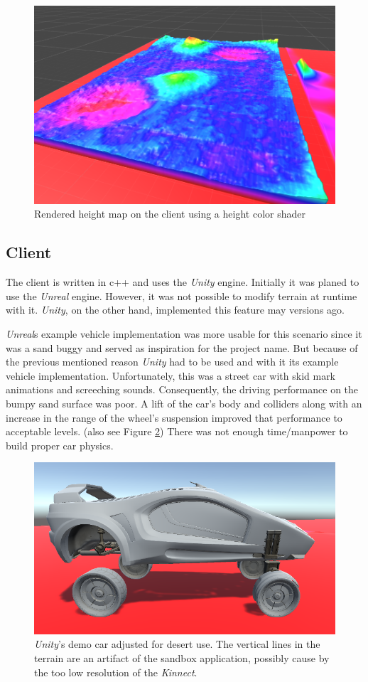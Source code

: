 \documentclass[12pt,a4paper,twoside,titlepage,headsepline,numbers=noenddot,listof=totoc,index=totoc,bibliography=totoc]{scrartcl}
\theoremstyle{break}
\begin{document}
\begin{figure}
	\centering
	\includegraphics[width=0.8\linewidth]{figures/sandboxHeightShade}
	\caption{Rendered height map on the client using a height color shader}
	\label{fig:sandboxheightshade}
\end{figure}

\subsection{Client}
The client is written in c++ and uses the \textit{Unity} engine. Initially it was planed to use the \textit{Unreal} engine. However, it was not possible to modify terrain at runtime with it. \textit{Unity}, on the other hand, implemented this feature may versions ago. 

\textit{Unreal}s example vehicle implementation was more usable for this scenario since it was a sand buggy and served as inspiration for the project name. But because of the previous mentioned reason \textit{Unity} had to be used and with it its example vehicle implementation. Unfortunately, this was a street car with skid mark animations and screeching sounds. Consequently, the driving performance on the bumpy sand surface was poor. A lift of the car's body and colliders along with an increase in the range of the wheel's suspension improved that performance to acceptable levels. (also see Figure \ref{fig:streetcarbuggy}) There was not enough time/manpower to build proper car physics.   

\begin{figure}
	\centering
	\includegraphics[width=0.7\linewidth]{figures/streetcarbuggy}
	\caption{\textit{Unity}'s demo car adjusted for desert use. The vertical lines in the terrain are an artifact of the sandbox application, possibly cause by the too low resolution of the \textit{Kinnect}.}
	\label{fig:streetcarbuggy}
\end{figure}
\end{document}
